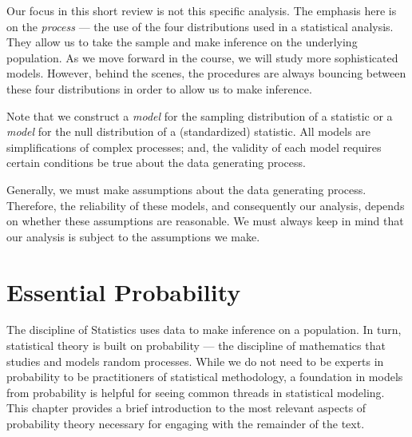 \documentclass[
  letterpaper,
  DIV=11,
  numbers=noendperiod]{scrreprt}
\theoremstyle{definition}
\theoremstyle{definition}
\theoremstyle{remark}
\begin{document}
Our focus in this short review is not this specific analysis. The
emphasis here is on the \emph{process} --- the use of the four
distributions used in a statistical analysis. They allow us to take the
sample and make inference on the underlying population. As we move
forward in the course, we will study more sophisticated models. However,
behind the scenes, the procedures are always bouncing between these four
distributions in order to allow us to make inference.

\begin{tcolorbox}[enhanced jigsaw, left=2mm, toprule=.15mm, arc=.35mm, breakable, opacitybacktitle=0.6, opacityback=0, rightrule=.15mm, colbacktitle=quarto-callout-note-color!10!white, coltitle=black, leftrule=.75mm, toptitle=1mm, colframe=quarto-callout-note-color-frame, titlerule=0mm, title=\textcolor{quarto-callout-note-color}{\faInfo}\hspace{0.5em}{Note}, bottomrule=.15mm, colback=white, bottomtitle=1mm]

Note that we construct a \emph{model} for the sampling distribution of a
statistic or a \emph{model} for the null distribution of a
(standardized) statistic. All models are simplifications of complex
processes; and, the validity of each model requires certain conditions
be true about the data generating process.

Generally, we must make assumptions about the data generating process.
Therefore, the reliability of these models, and consequently our
analysis, depends on whether these assumptions are reasonable. We must
always keep in mind that our analysis is subject to the assumptions we
make.

\end{tcolorbox}

\hypertarget{sec-essential-probability}{%
\chapter{Essential Probability}\label{sec-essential-probability}}

\providecommand{\norm}[1]{\left\lVert#1\right\rVert}
\providecommand{\abs}[1]{\left\lvert#1\right\rvert}
\providecommand{\dist}[1]{\stackrel{\text{#1}}{\sim}}
\providecommand{\ind}[1]{\mathbb{I}\left(#1\right)}
\providecommand{\bm}[1]{\mathbf{#1}}
\providecommand{\bs}[1]{\boldsymbol{#1}}
\providecommand{\Ell}{\mathcal{L}}
\providecommand{\indep}{\perp\negthickspace\negmedspace\perp}

The discipline of Statistics uses data to make inference on a
population. In turn, statistical theory is built on probability --- the
discipline of mathematics that studies and models random processes.
While we do not need to be experts in probability to be practitioners of
statistical methodology, a foundation in models from probability is
helpful for seeing common threads in statistical modeling. This chapter
provides a brief introduction to the most relevant aspects of
probability theory necessary for engaging with the remainder of the
text.
\end{document}
